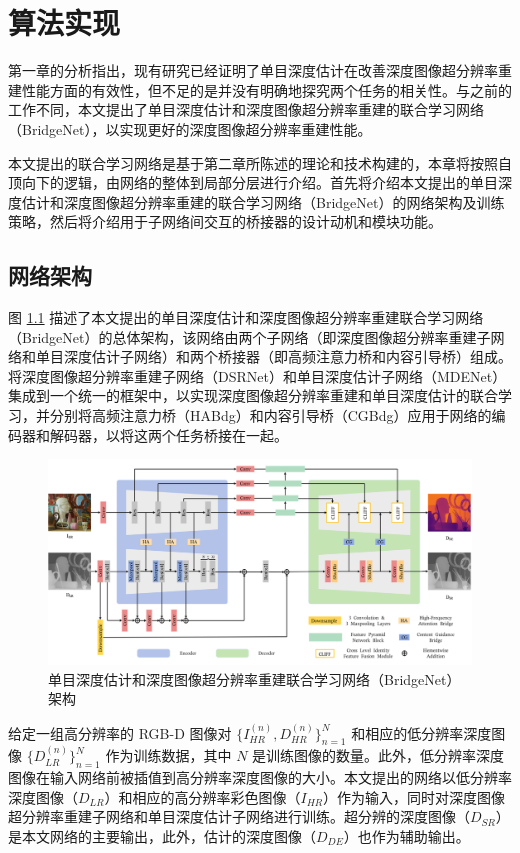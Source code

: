 \chapter{算法实现}

第一章的分析指出，现有研究已经证明了单目深度估计在改善深度图像超分辨率重建性能方面的有效性，但不足的是并没有明确地探究两个任务的相关性。与之前的工作不同，本文提出了单目深度估计和深度图像超分辨率重建的联合学习网络（BridgeNet），以实现更好的深度图像超分辨率重建性能。

本文提出的联合学习网络是基于第二章所陈述的理论和技术构建的，本章将按照自顶向下的逻辑，由网络的整体到局部分层进行介绍。首先将介绍本文提出的单目深度估计和深度图像超分辨率重建的联合学习网络（BridgeNet）的网络架构及训练策略，然后将介绍用于子网络间交互的桥接器的设计动机和模块功能。

\section{网络架构}

图 \ref{fig:fig3-1} 描述了本文提出的单目深度估计和深度图像超分辨率重建联合学习网络（BridgeNet）的总体架构，该网络由两个子网络（即深度图像超分辨率重建子网络和单目深度估计子网络）和两个桥接器（即高频注意力桥和内容引导桥）组成。将深度图像超分辨率重建子网络（DSRNet）和单目深度估计子网络（MDENet）集成到一个统一的框架中，以实现深度图像超分辨率重建和单目深度估计的联合学习，并分别将高频注意力桥（HABdg）和内容引导桥（CGBdg）应用于网络的编码器和解码器，以将这两个任务桥接在一起。

\begin{figure}[!htbp]
	\centering
	\includegraphics{figures/17.png}
	\caption{单目深度估计和深度图像超分辨率重建联合学习网络（BridgeNet）架构}
	\label{fig:fig3-1}
\end{figure}

\newpage
给定一组高分辨率的 RGB-D 图像对 $\{I_{HR}^{\left(n\right)},D_{HR}^{\left(n\right)}\}_{n=1}^N$ 和相应的低分辨率深度图像 $\{D_{LR}^{\left(n\right)}\}_{n=1}^N$ 作为训练数据，其中 $N$ 是训练图像的数量。此外，低分辨率深度图像在输入网络前被插值到高分辨率深度图像的大小。本文提出的网络以低分辨率深度图像（$D_{LR}$）和相应的高分辨率彩色图像（$I_{HR}$）作为输入，同时对深度图像超分辨率重建子网络和单目深度估计子网络进行训练。超分辨的深度图像（$D_{SR}$）是本文网络的主要输出，此外，估计的深度图像（$D_{DE}$）也作为辅助输出。

